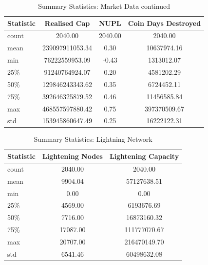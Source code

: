 \begin{table}[ht]
    \centering
    \begin{tabular}{|l|c|c|c|}
    \hline
    Statistic & Realised Cap    & NUPL    & Coin Days Destroyed \\ \hline
    count     & 2040.00         & 2040.00 & 2040.00             \\ \hline
    mean      & 239097911053.34 & 0.30    & 10637974.16         \\ \hline
    min       & 76222559953.09  & -0.43   & 1313012.07          \\ \hline
    25\%      & 91240764924.07  & 0.20    & 4581202.29          \\ \hline
    50\%      & 129846243343.62 & 0.35    & 6724452.11          \\ \hline
    75\%      & 392646325879.52 & 0.46    & 11456585.84         \\ \hline
    max       & 468557597880.42 & 0.75    & 397370509.67        \\ \hline
    std       & 153945860647.49 & 0.25    & 16222122.31         \\ \hline
    \end{tabular}
    \caption{Summary Statistics: Market Data continued}
    \label{tab:market_data_cont}
\end{table}

\begin{table}[ht]
    \centering
    \begin{tabular}{|l|c|c|}
    \hline
    Statistic & Lightening Nodes & Lightening Capacity \\ \hline
    count     & 2040.00          & 2040.00             \\ \hline
    mean      & 9904.04          & 57127638.51         \\ \hline
    min       & 0.00             & 0.00                \\ \hline
    25\%      & 4569.00          & 6193676.69          \\ \hline
    50\%      & 7716.00          & 16873160.32         \\ \hline
    75\%      & 17087.00         & 111777070.67        \\ \hline
    max       & 20707.00         & 216470149.70        \\ \hline
    std       & 6541.46          & 60498632.08         \\ \hline
    \end{tabular}
    \caption{Summary Statistics: Lightning Network}
    \label{tab:lightning_network}
\end{table}

